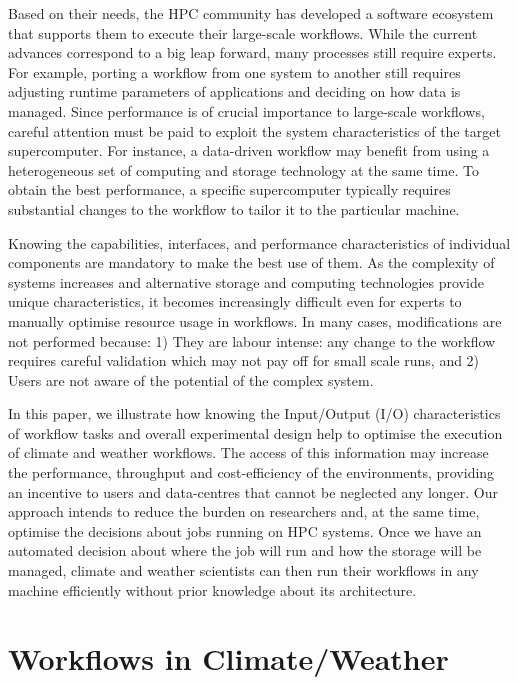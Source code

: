 \documentclass{superfri}
\begin{document}
Based on their needs, the HPC community has developed a software ecosystem that supports them to execute their large-scale workflows.
While the current advances correspond to a big leap forward, many processes still require experts.
For example, porting a workflow from one system to another still requires adjusting runtime parameters of applications and deciding on how data is managed.
Since performance is of crucial importance to large-scale workflows, careful attention must be paid to exploit the system characteristics of the target supercomputer.
For instance, a data-driven workflow may benefit from using a heterogeneous set of computing and storage technology at the same time.
To obtain the best performance, a specific supercomputer typically requires substantial changes to the workflow to tailor it to the particular machine.

Knowing the capabilities, interfaces, and performance characteristics of individual components are mandatory to make the best use of them.
As the complexity of systems increases and alternative storage and computing technologies provide unique characteristics, it becomes increasingly difficult even for experts to manually optimise resource usage in workflows.
In many cases, modifications are not performed because: 1) They are labour intense: any change to the workflow requires careful validation which may not pay off for small scale runs, and 2) Users are not aware of the potential of the complex system.

In this paper, we illustrate how knowing the Input/Output (I/O) characteristics of workflow tasks and overall experimental design help to optimise the execution of climate and weather workflows. The access of this information may increase the performance, throughput and cost-efficiency of the environments, providing an incentive to users and data-centres that cannot be neglected any longer.
Our approach intends to reduce the burden on researchers and, at the same time, optimise the decisions about jobs running on HPC systems.
Once we have an automated decision about where the job will run and how the storage will be managed, climate and weather scientists can then run their workflows in any machine efficiently without prior knowledge about its architecture.

\section{Workflows in Climate/Weather}
\label{sec:workflows}
\end{document}
